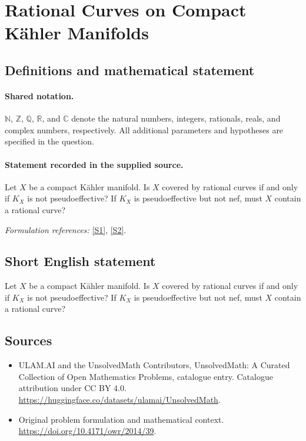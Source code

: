 \documentclass[11pt]{article}
\newcommand{\sref}[2]{\hyperlink{source:#1:#2}{[S#2]}}
\begin{document}
\section{Rational Curves on Compact Kähler Manifolds}\label{statement}

\subsection{Definitions and mathematical statement}

\paragraph{Shared notation.}$\mathbb N$, $\mathbb Z$, $\mathbb Q$, $\mathbb R$, and $\mathbb C$ denote the natural numbers, integers, rationals, reals, and complex numbers, respectively. All additional parameters and hypotheses are specified in the question.


\paragraph{Statement recorded in the supplied source.}
Let $X$ be a compact Kähler manifold. Is $X$ covered by rational curves if and only if $K_X$ is not pseudoeffective? If $K_X$ is pseudoeffective but not nef, must $X$ contain a rational curve?
\par\smallskip\textit{Formulation references:} \sref{statement}{1}, \sref{statement}{2}.
\subsection{Short English statement}
Let $X$ be a compact Kähler manifold. Is $X$ covered by rational curves if and only if $K_X$ is not pseudoeffective? If $K_X$ is pseudoeffective but not nef, must $X$ contain a rational curve?
\subsection{Sources}
\begin{itemize}
\item[\hypertarget{source:statement:1}{S1}] ULAM.AI and the UnsolvedMath Contributors, UnsolvedMath: A Curated Collection of Open Mathematics Problems, catalogue entry. Catalogue attribution under CC BY 4.0.
\url{https://huggingface.co/datasets/ulamai/UnsolvedMath}.
\item[\hypertarget{source:statement:2}{S2}] Original problem formulation and mathematical context.
\url{https://doi.org/10.4171/owr/2014/39}.
\end{itemize}
\label{end:statement}
\end{document}
